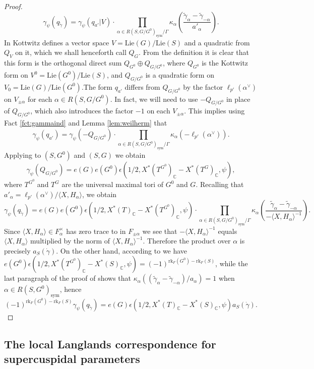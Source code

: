 \documentclass{article}
\def\tx#1{\textrm{#1}}
\def\C{\mathbb{C}}
\def\<{\langle}
\def\>{\rangle}
\theoremstyle{definition}
\numberwithin{equation}{subsection}
\renewcommand{\-}{\hyp{}}
\begin{document}
\begin{proof}
	\[ \gamma_\psi(q_{\tilde \gamma}) = \gamma_\psi(q_{a'}|V) \cdot \prod_{\alpha \in R(S,G/G^0)_\tx{sym}/\Gamma} \kappa_\alpha\left(\frac{\tilde \gamma_\alpha-\tilde \gamma_{-\alpha}}{a'_\alpha}\right). \]
	In \cite[\S1.3.3]{KotWeil} Kottwitz defines a vector space $V=\tx{Lie}(G)/\tx{Lie}(S)$ and a quadratic from $Q_V$ on it, which we shall henceforth call $Q_G$. From the definition it is clear that this form is the orthogonal direct sum $Q_{G^0} \oplus Q_{G/G^0}$, where $Q_{G^0}$ is the Kottwitz form on $V^0=\tx{Lie}(G^0)/\tx{Lie}(S)$, and $Q_{G/G^0}$ is a quadratic form on $V_0=\tx{Lie}(G)/\tx{Lie}(G^0)$.The form $q_{a'}$ differs from $Q_{G/G^0}$
	by the factor $\ell_{p'}(\alpha^\vee)$ on $V_{\pm\alpha}$ for each $\alpha \in R(S,G/G^0)$. In fact, we will need to use $-Q_{G/G^0}$ in place of $Q_{G/G^0}$, which also introduces the factor $-1$ on each $V_{\pm\alpha}$. This implies using Fact \ref{fct:gammaind} and Lemma \ref{lem:weilherm} that
	\[ \gamma_\psi(q_{a'}) = \gamma_\psi(-Q_{G/G^0})\cdot \prod_{\alpha \in R(S,G/G^0)_\tx{sym}/\Gamma} \kappa_\alpha(-\ell_{p'}(\alpha^\vee)). \]
	Applying \cite[Theorem 1.1]{KotWeil} to $(S,G^0)$ and $(S,G)$ we obtain
	\[ \gamma_\psi(Q_{G/G^0})=e(G)e(G^0)\epsilon(1/2,X^*(T^{G^0})_\C-X^*(T^G)_\C,\psi), \]
	where $T^{G^0}$ and $T^G$ are the universal maximal tori of $G^0$ and $G$. Recalling that $a'_\alpha=\ell_{p'}(\alpha^\vee)/\<X,H_\alpha\>$, we obtain
	\[ \gamma_\psi(q_{\tilde\gamma}) = e(G)e(G^0)\epsilon(1/2,X^*(T)_\C-X^*(T^{G^0})_\C,\psi)\cdot \prod_{\alpha \in R(S,G/G^0)_\tx{sym}/\Gamma}\kappa_\alpha\left(\frac{\tilde \gamma_\alpha-\tilde \gamma_{-\alpha}}{-\<X,H_\alpha\>^{-1}}\right). \]
	Since $\<X,H_\alpha\> \in F_\alpha^\times$ has zero trace to in $F_{\pm\alpha}$ we see that $-\<X,H_\alpha\>^{-1}$ equals $\<X,H_\alpha\>$ multiplied by the norm of $\<X,H_\alpha\>^{-1}$. Therefore the product over $\alpha$ is precisely $a_S(\dot \gamma)$. On the other hand, according to \cite[Lemma 4.9.1]{KalRSP} we have $e(G^0)\epsilon(1/2,X^*(T^{G^0})_\C-X^*(S)_\C,\psi)=(-1)^{\tx{rk}_F(G^0)-\tx{rk}_F(S)}$, while the last paragraph of the proof of \cite[Proposition 4.9.2]{KalRSP} shows that $\kappa_\alpha((\tilde\gamma_\alpha-\tilde\gamma_{-\alpha})/a_\alpha)=1$ when $\alpha \in R(S,G^0)_\tx{sym}$, hence 
	\[ (-1)^{\tx{rk}_F(G^0)-\tx{rk}_F(S)} \gamma_\psi(q_{\tilde\gamma}) = e(G)\epsilon(1/2,X^*(T)_\C-X^*(S)_\C,\psi)a_S(\dot\gamma). \]
\end{proof}

\subsection{The local Langlands correspondence for supercuspidal parameters} \label{sub:llc}
\end{document}

